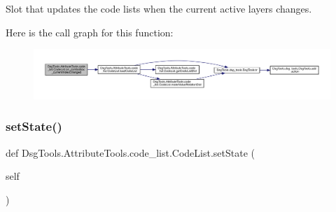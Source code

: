 \begin{DoxyVerb}Slot that updates the code lists when the current active layers changes.
\end{DoxyVerb}
 Here is the call graph for this function\+:
\nopagebreak
\begin{figure}[H]
\begin{center}
\leavevmode
\includegraphics[width=350pt]{class_dsg_tools_1_1_attribute_tools_1_1code__list_1_1_code_list_aaa550bd981e4c040fa9b8cd7d44671b1_cgraph}
\end{center}
\end{figure}
\mbox{\label{class_dsg_tools_1_1_attribute_tools_1_1code__list_1_1_code_list_af2f576bf21080f886795e46d6d093331}} 
\subsubsection{\texorpdfstring{set\+State()}{setState()}}
{\footnotesize\ttfamily def Dsg\+Tools.\+Attribute\+Tools.\+code\+\_\+list.\+Code\+List.\+set\+State (\begin{DoxyParamCaption}\item[{}]{self }\end{DoxyParamCaption})}


